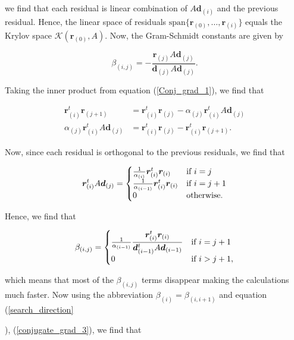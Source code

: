 \documentclass[12pt,a4paper,oneside]{book}
\begin{document}
{we find that each residual is linear combination of $A \bm{d}_{(i)}$ and the previous residual. Hence, the linear space of residuals $\text{span} \{ \bm{r}_{(0)}, \ldots, \bm{r}_{(i)} \}$ equals the Krylov space $
\mathcal{K} (\bm{r}_{(0)}, A)$. Now, the Gram-Schmidt constants are given by

\begin{equation} \label{Gram_schmidt_2}
\beta_{(i,j)} = -\dfrac{\bm{r}_{(j)} A \bm{d}_{(j)}}{\bm{d}_{(j)} A \bm{d}_{(j)} }.
\end{equation}

Taking the inner product from equation (\ref{Conj_grad_1}), we find that 

\begin{align}
\bm{r}_{(i)}^t \bm{r}_{(j+1)} &= \bm{r}_{(i)}^t \bm{r}_{(j)} - \alpha_{(j)} \bm{r}_{(i)}^t A \bm{d}_{(j)} \nonumber \\
\alpha_{(j)} \bm{r}_{(i)}^t A \bm{d}_{(j)} &= \bm{r}_{(i)}^t \bm{r}_{(j)} - \bm{r}_{(i)}^t \bm{r}_{(j+1)} .
\end{align}

Now, since each residual is  orthogonal to the previous residuals, we find that

\begin{equation}
 \bm{r}_{(i)}^t A \bm{d}_{(j)}  = \left\{
  \begin{array}{@{}ll@{}}
    \frac{1}{\alpha_{(i)}} \bm{r}_{(i)}^t  \bm{r}_{(i)}   & \text{if}\ i = j \\
     \frac{1}{\alpha_{(i-1)}} \bm{r}_{(i)}^t  \bm{r}_{(i)} &\text{if}\ i = j+1 \\ 
     0 &  \text{otherwise}.
  \end{array}\right.
\end{equation}

Hence, we find that 

\begin{equation}
\beta_{(i,j)} = \left\{
  \begin{array}{@{}ll@{}}
    \frac{1}{\alpha_{(i-1)}} \dfrac{\bm{r}_{(i)}^t  \bm{r}_{(i)}}{\bm{d}^t_{(i-1)} A \bm{d}_{(i-1)} }  & \text{if}\ i = j+1 \\
     0 &  \text{if}\ i > j+1,
  \end{array}\right.
\end{equation}

which means that most of the  $\beta_{(i,j)} $ terms disappear making the calculations much faster. Now using the abbreviation $\beta_{(i)} = \beta_{(i,i+1)}$ and equation (\ref{search_direction}}), (\ref{conjugate_grad_3}), we find that 
\end{document}

